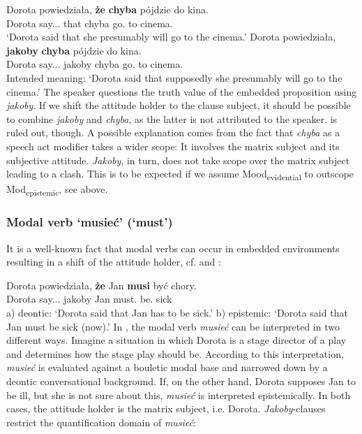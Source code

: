 \documentclass[output=paper
,modfonts
,nonflat]{langsci/langscibook}
\begin{document}
\ea \ea \gll	Dorota powiedziała, \textbf{że} \textbf{chyba} pójdzie do kina. \\
		Dorota say.{\lptcp}.{\sg}.{\fem} that chyba go.{\thirdperson}{\sg} to cinema.{\gen} \\
		\glt`Dorota said that she presumably will go to the cinema.'
		\ex\gll	*Dorota powiedziała, \textbf{jakoby} \textbf{chyba} pójdzie do kina. \label{kanapka} \\
			Dorota say.{\lptcp}.{\sg}.{\fem} jakoby chyba go.{\thirdperson}{\sg} to cinema.{\gen} \\
		\glt Intended meaning: `Dorota said that supposedly she presumably will go to the cinema.'
\z\z
The speaker questions the truth value of the embedded proposition using \emph{jakoby}. If we shift the attitude holder to the clause subject, it should be possible to combine \emph{jakoby} and \emph{chyba}, as the latter is not attributed to the speaker.  is ruled out, though. A possible explanation comes from the fact that \emph{chyba} as a speech act modifier takes a wider scope: It involves the matrix subject and its subjective attitude. \emph{Jakoby}, in turn, does not take scope over the matrix subject leading to a clash. This is to be expected if we assume Mood\textsubscript{evidential} to outscope Mod\textsubscript{epistemic}, see  above.

\subsubsection{Modal verb `musieć' (`must')}
It is a well-known fact that modal verbs can occur in embedded environments resulting in a shift of the attitude holder, cf. \textcite{Hacquard2006} and \textcite{Hacquard-Wellwood2012}:

\ea \gll Dorota powiedziała, \textbf{że} Jan \textbf{musi} być chory. \label{must} \\
		Dorota say.{\lptcp}.{\sg}.{\fem} jakoby Jan must.{\thirdperson}{\sg} be.{\infv} sick \\
\glt	a) deontic: `Dorota said that Jan has to be sick.'
\glt	b) epistemic: `Dorota said that Jan must be sick (now).'
\z
In , the modal verb \emph{musieć} can be interpreted in two different ways. Imagine a situation in which Dorota is a stage director of a play and determines how the stage play should be. According to this interpretation, \emph{musieć} is evaluated against a bouletic modal base and narrowed down by a deontic conversational background. If, on the other hand, Dorota supposes Jan to be ill, but she is not sure about this, \emph{musieć} is interpreted epistemically. In both cases, the attitude holder is the matrix subject, i.e. Dorota. \emph{Jakoby}-clauses restrict the quantification domain of \emph{musieć}:
\end{document}
